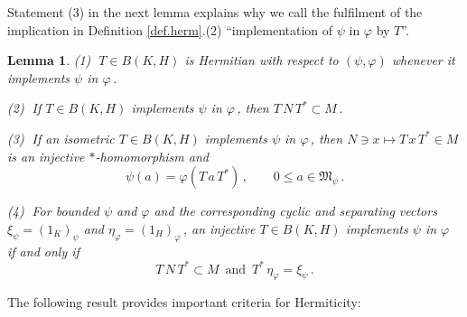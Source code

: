 \documentclass[reqno]{amsart}
\newtheorem{lemma}[theorem]{Lemma}
\theoremstyle{definition}
\theoremstyle{remark}
\numberwithin{equation}{section}
\theoremstyle{plain}
\begin{document}
Statement (3) in the next lemma explains why we call the fulfilment
of the implication in Definition \ref{def.herm}.(2) ``implementation
of $\psi$ in $\varphi$ by $T$''.
\smallskip

\begin{lemma}\label{herm}
{\rm (1)} $\; T\in B(K,H)$ is Hermitian with respect to $(\psi ,\varphi )$
whenever it \\ \phantom{xxxxxx} implements $\psi$ in $\varphi\,$.

{\rm (2)} $\;$If $T\in B(K,H)$ implements $\psi$ in $\varphi\,$, then
$T\, N\, T^*\subset M\,$.

{\rm (3)} $\;$If an isometric $T\in B(K,H)$ implements $\psi$ in
$\varphi\,$, then $N\ni x\mapsto T\, x\, T^*\in M$ \\
\phantom{xxxxxx} is an injective $*$-homomorphism and
\begin{equation*}
\psi (a) =\varphi (T\, a\, T^*)\, ,\qquad 0\leq a\in\mathfrak M_\psi\, .
\end{equation*}

{\rm (4)} $\;$For bounded $\psi$ and $\varphi$ and the corresponding
cyclic and separating vectors \\ \phantom{xxxxxx} $\xi_\psi =(1_K)_\psi$
and $\eta_\varphi =(1_H)_\varphi\,$, an injective $T\in B(K,H)$
implements $\psi$ in $\varphi$ \\ \phantom{xxxxxx} if and only if
\begin{equation*}
T\, N\, T^*\subset M\,\text{ and }\, T^*\,\eta_\varphi =\xi_\psi\, .
\end{equation*}
\end{lemma}
\smallskip

The following result provides important criteria for Hermiticity:
\smallskip
\end{document}
